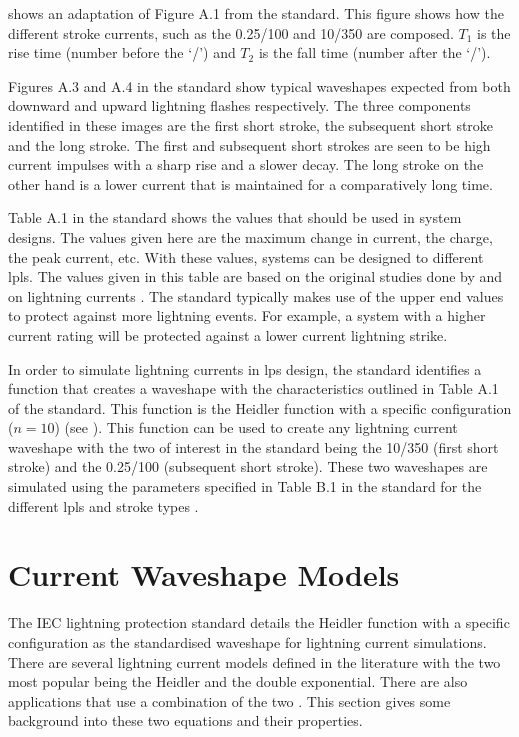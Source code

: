  shows an adaptation of Figure A.1 from the standard. This figure shows how the different stroke currents, such as the 0.25/100 and 10/350 are composed. $T_1$ is the rise time (number before the `/') and $T_2$ is the fall time (number after the `/').

Figures A.3 and A.4 in the standard show typical waveshapes expected from both downward and upward lightning flashes respectively. The three components identified in these images are the first short stroke, the subsequent short stroke and the long stroke. The first and subsequent short strokes are seen to be high current impulses with a sharp rise and a slower decay. The long stroke on the other hand is a lower current that is maintained for a comparatively long time.

Table A.1 in the standard shows the values that should be used in system designs. The values given here are the maximum change in current, the charge, the peak current, etc. With these values, systems can be designed to different \glspl{lpl}. The values given in this table are based on the original studies done by \citeauthor{Anderson1980} and \citeauthor{Berger1975} on lightning currents \cite{Anderson1980,Berger1975}. The standard typically makes use of the upper end values to protect against more lightning events. For example, a system with a higher current rating will be protected against a lower current lightning strike.

In order to simulate lightning currents in \gls{lps} design, the standard identifies a function that creates a waveshape with the characteristics outlined in Table A.1 of the standard. This function is the Heidler function with a specific configuration ($n = 10$) (see ). This function can be used to create any lightning current waveshape with the two of interest in the standard being the 10/350 (first short stroke) and the 0.25/100 (subsequent short stroke). These two waveshapes are simulated using the parameters specified in Table B.1 in the standard for the different \glspl{lpl} and stroke types \cite{IEC623051}.


\section{Current Waveshape Models}
\label{sec:background_current_waveshape_models}
The IEC lightning protection standard details the Heidler function with a specific configuration as the standardised waveshape for lightning current simulations. There are several lightning current models defined in the literature with the two most popular being the Heidler and the double exponential. There are also applications that use a combination of the two \cite{Javor2011,Nucci2003,Pavanello2007}. This section gives some background into these two equations and their properties.

